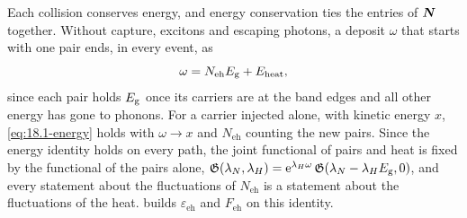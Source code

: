 Each collision conserves energy, and energy conservation ties the entries of $\bm{N}$ together. Without capture, excitons and escaping photons, a deposit $\omega$ that starts with one pair ends, in every event, as
\begin{equation}
  \omega = N_{\mathrm{eh}}E_{\mathrm{g}} + E_{\mathrm{heat}} ,
  \label{eq:18.1-energy}
\end{equation}
since each pair holds $E_{\mathrm{g}}$ once its carriers are at the band edges and all other energy has gone to phonons. For a carrier injected alone, with kinetic energy $x$, \cref{eq:18.1-energy} holds with $\omega \to x$ and $N_{\mathrm{eh}}$ counting the new pairs. Since the energy identity holds on every path, the joint functional of pairs and heat is fixed by the functional of the pairs alone, $\mathfrak{G}(\lambda_N, \lambda_H) = \mathrm{e}^{\lambda_H\omega}\,\mathfrak{G}(\lambda_N - \lambda_HE_{\mathrm{g}}, 0)$, and every statement about the fluctuations of $N_{\mathrm{eh}}$ is a statement about the fluctuations of the heat.  builds $\varepsilon_{\mathrm{eh}}$ and $F_{\mathrm{eh}}$ on this identity.

